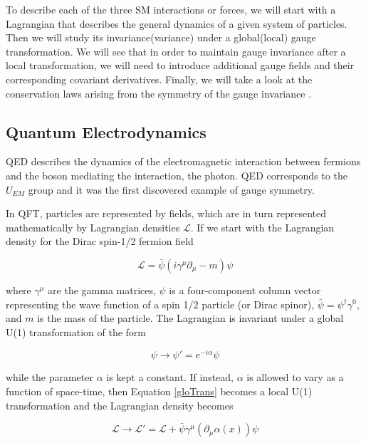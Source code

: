 To describe each of the three SM interactions or forces, we will start with a Lagrangian that describes the general dynamics of a given system of particles. Then we will study its invariance(variance) under a global(local) gauge transformation. We will see that in order to maintain gauge invariance after a local transformation, we will need to introduce additional gauge fields and their corresponding covariant derivatives. Finally, we will take a look at the conservation laws arising from the symmetry of the gauge invariance \cite{Noether1918}.

\subsection{Quantum Electrodynamics}

QED describes the dynamics of the electromagnetic interaction between fermions and the boson mediating the interaction, the photon. QED corresponds to the $U_{EM}$ group and it was the first discovered example of gauge symmetry.%

In QFT, particles are represented by fields\cite{Peskin:1995ev}, which are in turn represented mathematically by Lagrangian densities $\mathcal{L}$. If we start with the Lagrangian density for the Dirac spin-1/2 fermion field\cite{wiki:diracfield}

\begin{equation}
\mathcal{L} = \bar{\psi}(i\gamma^{\mu}\partial_{\mu} - m)\psi
\end{equation}

where $\gamma^{\mu}$ are the gamma matrices\cite{wiki:gammam}, $\psi$ is a four-component column vector representing the wave function of a spin 1/2 particle (or Dirac spinor), $\bar{\psi}=\psi^{\dagger}\gamma^{0}$, and $m$ is the mass of the particle. The Lagrangian is invariant under a global U(1) transformation of the form

\begin{equation}
\label{gloTrans}
\psi \rightarrow \psi '= e^{-i\alpha}\psi
\end{equation}

while the parameter $\alpha$ is kept a constant. If instead, $\alpha$ is allowed to vary as a function of space-time, then Equation \ref{gloTrans} becomes a local U(1) transformation and the Lagrangian density becomes

\begin{equation}
\mathcal{L}\rightarrow \mathcal{L'} = \mathcal{L} + \bar{\psi}\gamma^{\mu}(\partial_{\mu}\alpha(x))\psi
\end{equation}

